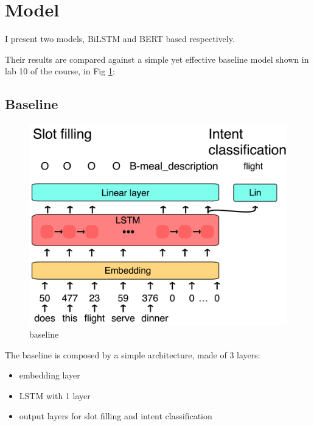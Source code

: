 \documentclass[a4paper]{article}
\begin{document}
\section{Model}

I present two models, BiLSTM and BERT based respectively. 

Their results are compared against a simple yet effective baseline model shown in lab 10 of the course, in Fig \ref{fig:baseline}:

\subsection{Baseline}
\begin{figure}[h!]
	\centering
	\includegraphics[width=0.8\linewidth]{../assets/images/baseline.png}
	\caption{baseline}
	\label{fig:baseline}
\end{figure}
The baseline is composed by a simple architecture, made of 3 layers:
\begin{itemize}
	\item embedding layer
	\item LSTM with 1 layer
	\item output layers for slot filling and intent classification
\end{itemize}
\end{document}
